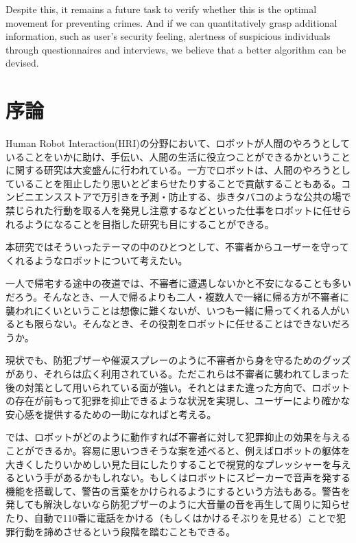 \documentclass{kuisthesis}
\begin{document}
\begin{eabstract}
Despite this, it remains a future task to verify whether this is the optimal movement for preventing crimes. And if we can quantitatively grasp additional information, such as user's security feeling, alertness of suspicious individuals through questionnaires and interviews, we believe that a better algorithm can be devised.
\end{eabstract}

\tableofcontents






\section{序論}

Human Robot Interaction(HRI)の分野において、ロボットが人間のやろうとしていることをいかに助け、手伝い、人間の生活に役立つことができるかということに関する研究は大変盛んに行われている。一方でロボットは、人間のやろうとしていることを阻止したり思いとどまらせたりすることで貢献することもある。コンビニエンスストアで万引きを予測・防止する、歩きタバコのような公共の場で禁じられた行動を取る人を発見し注意するなどといった仕事をロボットに任せられるようになることを目指した研究も目にすることができる。

本研究ではそういったテーマの中のひとつとして、不審者からユーザーを守ってくれるようなロボットについて考えたい。

一人で帰宅する途中の夜道では、不審者に遭遇しないかと不安になることも多いだろう。そんなとき、一人で帰るよりも二人・複数人で一緒に帰る方が不審者に襲われにくいということは想像に難くないが、いつも一緒に帰ってくれる人がいるとも限らない。そんなとき、その役割をロボットに任せることはできないだろうか。

現状でも、防犯ブザーや催涙スプレーのように不審者から身を守るためのグッズがあり、それらは広く利用されている。ただこれらは不審者に襲われてしまった後の対策として用いられている面が強い。それとはまた違った方向で、ロボットの存在が前もって犯罪を抑止できるような状況を実現し、ユーザーにより確かな安心感を提供するための一助になればと考える。

では、ロボットがどのように動作すれば不審者に対して犯罪抑止の効果を与えることができるか。容易に思いつきそうな案を述べると、例えばロボットの躯体を大きくしたりいかめしい見た目にしたりすることで視覚的なプレッシャーを与えるという手があるかもしれない。もしくはロボットにスピーカーで音声を発する機能を搭載して、警告の言葉をかけられるようにするという方法もある。警告を発しても解決しないなら防犯ブザーのように大音量の音を再生して周りに知らせたり、自動で110番に電話をかける（もしくはかけるそぶりを見せる）ことで犯罪行動を諦めさせるという段階を踏むこともできる。
\end{document}
